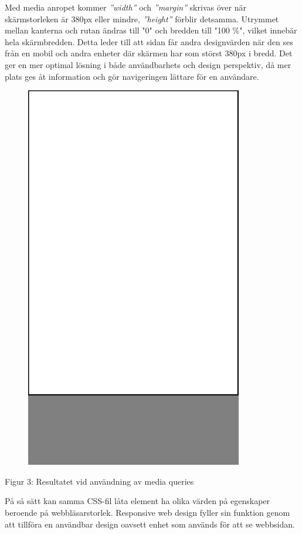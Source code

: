 \documentclass[11pt]{article}
\begin{document}
Med media anropet kommer \textit{”width”} och \textit{”margin”} skrivas över när skärmstorleken är 380px eller mindre, \textit{”height”} förblir detsamma. Utrymmet mellan kanterna och rutan ändras till "0" och bredden till "100 \%", vilket innebär hela skärmbredden. Detta leder till att sidan får andra designvärden när den ses från en mobil och andra enheter där skärmen har som störst 380px i bredd. Det ger en mer optimal lösning i både användbarhets och design perspektiv, då mer plats ges åt information och gör navigeringen lättare för en användare. 
\vspace{1cm}
\begin{figure}[h]
\centerline{%
\includegraphics[scale=0.25]{pics/mobilesmall.png}
}
\end{figure}
\centerline{Figur 3: Resultatet vid användning av media queries}
\vspace{0.5cm}

På så sätt kan samma CSS-fil låta element ha olika värden på egenskaper beroende på webbläsarstorlek. Responsive web design fyller sin funktion genom att tillföra en användbar design oavsett enhet som används för att se webbsidan. 
\newpage
\end{document}

